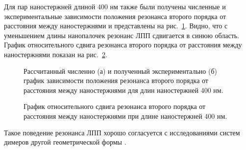 Для пар наностержней длиной 400 нм также были получены численные и экспериментальные зависимости положения резонанса второго порядка от расстояния между наностержнями и  представлены на рис.~\ref{img:a400simexp}. Видно, что с уменьшением длины нанопалочек резонанс ЛПП сдвигается в синюю область. График относительного сдвига резонанса второго порядка от расстояния между наностержнями показан на рис.~\ref{img:a400shift}.
\begin{figure}
\caption{Рассчитанный численно (а) и полученный экспериментально (б) график зависимости положения резонанса второго порядка от расстояния между наностержнями для длин наностержней 400 нм. }
\label{img:a400simexp}
\end{figure}
\begin{figure}
\caption{График относительного сдвига резонанса второго порядка от расстояния между наностержнями при длине наностержней 400 нм.}
\label{img:a400shift}
\end{figure}
Такое поведение резонанса ЛПП хорошо согласуется с исследованиями систем димеров другой геометрической формы \cite{plasonrulereq, nanoprism}.

